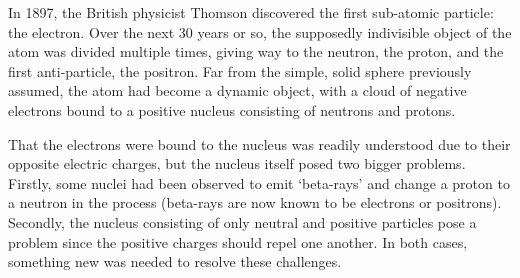 In 1897, the British physicist Thomson discovered the first sub-atomic particle: the electron.
Over the next 30 years or so, the supposedly indivisible object of the atom was divided multiple times, giving way to the neutron, the proton, and the first anti-particle, the positron.
Far from the simple, solid sphere previously assumed, the atom had become a dynamic object, with a cloud of negative electrons bound to a positive nucleus consisting of neutrons and protons.

That the electrons were bound to the nucleus was readily understood due to their opposite electric charges, but the nucleus itself posed two bigger problems.
Firstly, some nuclei had been observed to emit `beta-rays' and change a proton to a neutron in the process (beta-rays are now known to be electrons or positrons).
Secondly, the nucleus consisting of only neutral and positive particles pose a problem since the positive charges should repel one another.
In both cases, something new was needed to resolve these challenges.

